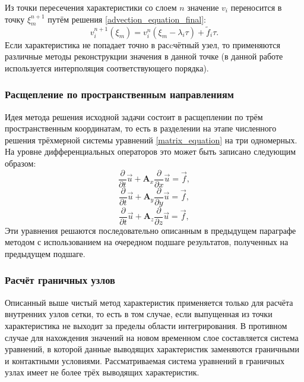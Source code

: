 Из точки пересечения характеристики со слоем $n$ значение $v_i$ переносится в 
точку $\xi^{n+1}_m$ путём решения \ref{advection_equation_final}:
$$v_i^{n+1}(\xi_m)=v^{n}_i(\xi_m-\lambda_i\tau) + {\tilde f}_i \tau.$$
Если характеристика не попадает точно в расcчётный узел, то применяются различные
методы реконструкции значения в данной точке (в данной работе используется
интерполяция соответствующего порядка).
\subsubsection{Расщепление по пространственным направлениям}				
Идея метода \cite{fedorenko} решения исходной задачи состоит в расщеплении по трём пространственным координатам, то есть в разделении на этапе численного решения трёхмерной системы уравнений \ref{matrix_equation} на три одномерных. На уровне дифференциальных операторов это может быть записано следующим образом:
\begin{equation}
\frac{\partial}{\partial t}\vec u+\mathbf{A}_x \frac{\partial}{\partial x}\vec u
= \vec f,
\label{matrix_equation_x}
\end{equation}
\begin{equation}
\frac{\partial}{\partial t}\vec u+\mathbf{A}_y \frac{\partial}{\partial y}\vec u
= \vec f,
\label{matrix_equation_y}
\end{equation}
\begin{equation}
\frac{\partial}{\partial t}\vec u+\mathbf{A}_z \frac{\partial}{\partial z}\vec u
= \vec f,
\label{matrix_equation_z}
\end{equation}
Эти уравнения решаются последовательно описанным в предыдущем параграфе методом с использованием
на очередном подшаге результатов, полученных на предыдущем подшаге.

\subsubsection{Расчёт граничных узлов}
Описанный выше чистый метод характеристик применяется только для расчёта внутренних узлов
сетки, то есть в том случае, если выпущенная из точки характеристика не
выходит за пределы области интегрирования. В противном случае для нахождения значений на новом временном слое  составляется система уравнений, в которой данные выводящих характеристик заменяются граничными и контактными условиями. Рассматриваемая система уравнений в граничных узлах имеет не более трёх
\cite{chelnokov} выводящих характеристик. 

